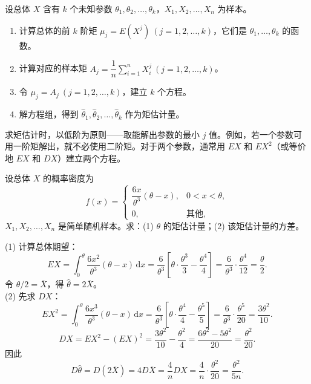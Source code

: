 \documentclass[lang=cn,11pt]{elegantbook}
\begin{document}
\begin{property}[矩估计的步骤] \label{prop:mme-steps}
设总体 \(X\) 含有 \(k\) 个未知参数 \(\theta_1, \theta_2, \dots, \theta_k\)，\(X_1, X_2, \dots, X_n\) 为样本。
\begin{enumerate}
    \item 计算总体的前 \(k\) 阶矩 \(\mu_j = E(X^j)\ (j=1,2,\dots,k)\)，它们是 \(\theta_1, \dots, \theta_k\) 的函数。
    \item 计算对应的样本矩 \(A_j = \dfrac{1}{n}\displaystyle\sum_{i=1}^{n}X_i^j\ (j=1,2,\dots,k)\)。
    \item 令 \(\mu_j = A_j\ (j=1,2,\dots,k)\)，建立 \(k\) 个方程。
    \item 解方程组，得到 \(\hat{\theta}_1, \hat{\theta}_2, \dots, \hat{\theta}_k\) 作为矩估计量。
\end{enumerate}
\end{property}

\begin{note}
求矩估计时，以低阶为原则——取能解出参数的最小 \(j\) 值。例如，若一个参数可用一阶矩解出，就不必使用二阶矩。对于两个参数，通常用 \(EX\) 和 \(EX^2\)（或等价地 \(EX\) 和 \(DX\)）建立两个方程。
\end{note}

\begin{exercise}[矩估计量的方差] \label{ex:mom_03}
设总体 \(X\) 的概率密度为
\[
f(x)=
\begin{cases}
\dfrac{6x}{\theta^3}(\theta-x), & 0<x<\theta,\\
0, & \text{其他},
\end{cases}
\]
\(X_1,X_2,\dots,X_n\) 是简单随机样本。求：(1) \(\theta\) 的矩估计量；(2) 该矩估计量的方差。
\end{exercise}
\begin{solution}
(1) 计算总体期望：
\[
EX=\int_0^\theta\frac{6x^2}{\theta^3}(\theta-x)\,\mathrm{d}x=\frac{6}{\theta^3}\!\left[\theta\cdot\frac{\theta^3}{3}-\frac{\theta^4}{4}\right]=\frac{6}{\theta^3}\cdot\frac{\theta^4}{12}=\frac{\theta}{2}.
\]
令 \(\theta/2=\overline{X}\)，得 \(\hat{\theta}=2\overline{X}\)。\\
(2) 先求 \(DX\)：
\[
EX^2=\int_0^\theta\frac{6x^3}{\theta^3}(\theta-x)\,\mathrm{d}x=\frac{6}{\theta^3}\!\left[\theta\cdot\frac{\theta^4}{4}-\frac{\theta^5}{5}\right]=\frac{6}{\theta^3}\cdot\frac{\theta^5}{20}=\frac{3\theta^2}{10}.
\]
\[
DX=EX^2-(EX)^2=\frac{3\theta^2}{10}-\frac{\theta^2}{4}=\frac{6\theta^2-5\theta^2}{20}=\frac{\theta^2}{20}.
\]
因此
\[
D\hat{\theta}=D(2\overline{X})=4D\overline{X}=\frac{4}{n}DX=\frac{4}{n}\cdot\frac{\theta^2}{20}=\frac{\theta^2}{5n}.
\]
\end{solution}
\end{document}

